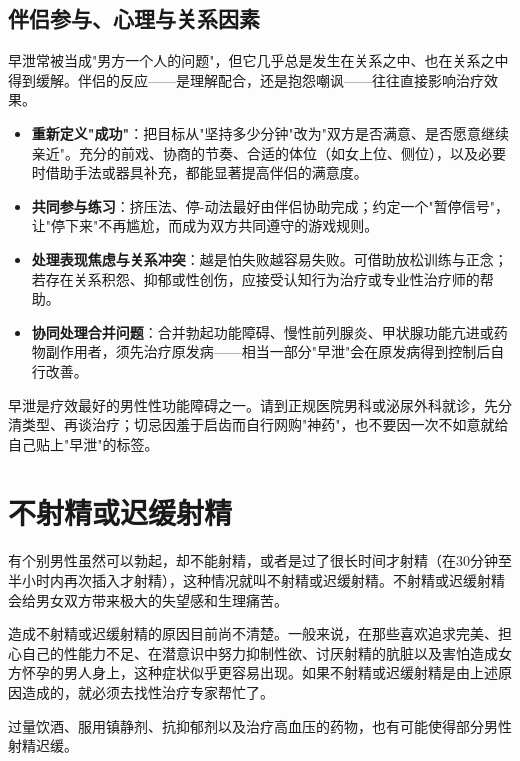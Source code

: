 \subsection{伴侣参与、心理与关系因素}

早泄常被当成"男方一个人的问题"，但它几乎总是发生在关系之中、也在关系之中得到缓解。伴侣的反应——是理解配合，还是抱怨嘲讽——往往直接影响治疗效果。

\begin{itemize}
	\item \textbf{重新定义"成功"}：把目标从"坚持多少分钟"改为"双方是否满意、是否愿意继续亲近"。充分的前戏、协商的节奏、合适的体位（如女上位、侧位），以及必要时借助手法或器具补充，都能显著提高伴侣的满意度。
	\item \textbf{共同参与练习}：挤压法、停-动法最好由伴侣协助完成；约定一个"暂停信号"，让"停下来"不再尴尬，而成为双方共同遵守的游戏规则。
	\item \textbf{处理表现焦虑与关系冲突}：越是怕失败越容易失败。可借助放松训练与正念；若存在关系积怨、抑郁或性创伤，应接受认知行为治疗或专业性治疗师的帮助。
	\item \textbf{协同处理合并问题}：合并勃起功能障碍、慢性前列腺炎、甲状腺功能亢进或药物副作用者，须先治疗原发病——相当一部分"早泄"会在原发病得到控制后自行改善。
\end{itemize}

\begin{tcolorbox}[colback=pink!5!white,colframe=red!50!black,title=贴心小叮咛]
早泄是疗效最好的男性性功能障碍之一。请到正规医院男科或泌尿外科就诊，先分清类型、再谈治疗；切忌因羞于启齿而自行网购"神药"，也不要因一次不如意就给自己贴上"早泄"的标签。
\end{tcolorbox}

\section{不射精或迟缓射精}

有个别男性虽然可以勃起，却不能射精，或者是过了很长时间才射精（在30分钟至半小时内再次插入才射精），这种情况就叫不射精或迟缓射精。不射精或迟缓射精会给男女双方带来极大的失望感和生理痛苦。

造成不射精或迟缓射精的原因目前尚不清楚。一般来说，在那些喜欢追求完美、担心自己的性能力不足、在潜意识中努力抑制性欲、讨厌射精的肮脏以及害怕造成女方怀孕的男人身上，这种症状似乎更容易出现。如果不射精或迟缓射精是由上述原因造成的，就必须去找性治疗专家帮忙了。

过量饮酒、服用镇静剂、抗抑郁剂以及治疗高血压的药物，也有可能使得部分男性射精迟缓。

